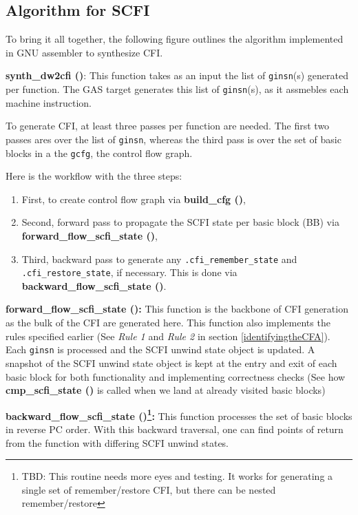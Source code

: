\documentclass{article} \usepackage[a4paper, total={6in, 8in}]{geometry}
\begin{document}
\subsection{Algorithm for SCFI}
To bring it all together, the following figure outlines the algorithm
implemented in GNU assembler to synthesize CFI.

\textbf{synth\_dw2cfi ()}: This function takes as an input the list of
\texttt{ginsn}(s) generated per function.  The GAS target generates this list
of \texttt{ginsn}(s), as it assmebles each machine instruction.

To generate CFI, at least three passes per function are needed.  The
first two passes ares over the list of \texttt{ginsn}, whereas the third pass
is over the set of basic blocks in a the \texttt{gcfg}, the control flow graph.

Here is the workflow with the three steps:
\begin{enumerate}
\item First, to create control flow graph via \textbf{build\_cfg ()},
\item Second, forward pass to propagate the SCFI state per basic block (BB) via
\textbf{forward\_flow\_scfi\_state ()},
\item Third, backward pass to generate any \texttt{.cfi\_remember\_state} and
\texttt{.cfi\_restore\_state}, if necessary.  This is done via \textbf{backward\_flow\_scfi\_state ()}.
\end{enumerate}

\textbf{forward\_flow\_scfi\_state ():} This function is the backbone of CFI
generation as the bulk of the CFI are generated here.  This function also
implements the rules specified earlier (See \textit{Rule 1} and \textit{Rule 2} in section
\ref{identifyingtheCFA}).  Each \texttt{ginsn} is processed and the SCFI unwind
state object is updated.   A snapshot of the SCFI unwind state object is
kept at the entry and exit of each basic block for both functionality and
implementing correctness checks (See how \textbf{cmp\_scfi\_state ()} is called when
we land at already visited basic blocks)

\textbf{backward\_flow\_scfi\_state ()\footnote{TBD: This routine needs more
eyes and testing.  It works for generating a single set of remember/restore
CFI, but there can be nested remember/restore}:} This function processes
the set of basic blocks in reverse PC order.  With this backward traversal, one
can find points of return from the function with differing SCFI unwind states.
\end{document}
